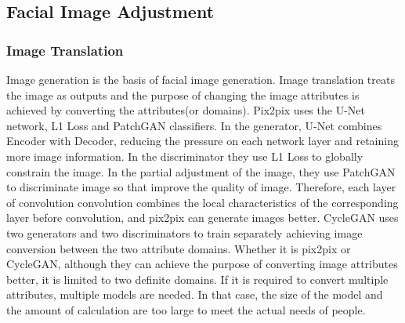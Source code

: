 \subsection{Facial Image Adjustment}

\subsubsection*{Image Translation}
Image generation is the basis of facial image generation.
Image translation treats the image as outputs and the purpose of changing the image attributes is achieved by converting the attributes(or domains).
Pix2pix uses the U-Net network, L1 Loss and PatchGAN classifiers.
In the generator, U-Net combines Encoder with Decoder,
    reducing the pressure on each network layer and retaining more image information.
In the discriminator they use L1 Loss to globally constrain the image.
In the partial adjustment of the image,
    they use PatchGAN to discriminate image so that improve the quality of image.
Therefore, each layer of convolution convolution combines the local characteristics of the corresponding layer before convolution,
    and pix2pix can generate images better.
CycleGAN uses two generators and two discriminators to train separately achieving image conversion between the two attribute domains.
Whether it is pix2pix or CycleGAN,
    although they can achieve the purpose of converting image attributes better,
    it is limited to two definite domains.
If it is required to convert multiple attributes, multiple models are needed.
In that case, the size of the model and the amount of calculation are too large to meet the actual needs of people.

